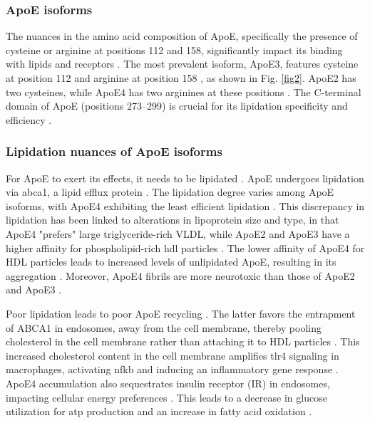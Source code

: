 \documentclass{amsart}
\begin{document}
\subsubsection{ApoE isoforms}
The nuances in the amino acid composition of ApoE, specifically the presence of cysteine or arginine at positions 112 and 158, significantly impact its binding with lipids and receptors \cite{Yassine2020APOEDisease}. The most prevalent isoform, ApoE3, features cysteine at position 112 and arginine at position 158  \cite{Yassine2020APOEDisease}, as shown in Fig. \ref{fig2}. ApoE2 has two cysteines, while ApoE4 has two arginines at these positions \cite{Yassine2020APOEDisease}. The C-terminal domain of ApoE (positions 273–299) is crucial for its lipidation specificity and efficiency \cite{Hu2015OpposingMice}.

\subsubsection{Lipidation nuances of ApoE isoforms}
For ApoE to exert its effects, it needs to be lipidated \cite{Husain2021APOETherapeutics}. ApoE undergoes lipidation via \acrfull{abca1}, a lipid efflux protein \cite{Flowers2020APOEBrain, Courtney2016LXRDisease}. The lipidation degree varies among ApoE isoforms, with ApoE4 exhibiting the least efficient lipidation \cite{Hu2015OpposingMice, Heinsinger2016ApolipoproteinFluid}. This discrepancy in lipidation has been linked to alterations in lipoprotein size and type, in that ApoE4 "prefers" large triglyceride-rich VLDL, while ApoE2 and ApoE3 have a higher affinity for phospholipid-rich \acrshort{hdl} particles \cite{Nguyen2010MolecularE4}. The lower affinity of ApoE4 for HDL particles leads to increased levels of unlipidated ApoE, resulting in its aggregation \cite{Hatters2006ApolipoproteinFunction}. Moreover, ApoE4 fibrils are more neurotoxic than those of ApoE2 and ApoE3 \cite{Hatters2006Amino-terminalFibrils}.

Poor lipidation leads to poor ApoE recycling \cite{Yassine2020APOEDisease}. The latter favors the entrapment of ABCA1 in endosomes, away from the cell membrane, thereby pooling cholesterol in the cell membrane rather than attaching it to HDL particles \cite{Rawat2019ApoE4Astrocytes}. This increased cholesterol content in the cell membrane amplifies \acrfull{tlr4} signaling in macrophages, activating \acrshort{nfkb} and inducing an inflammatory gene response \cite{Yassine2020APOEDisease}.  ApoE4 accumulation also sequestrates insulin receptor (IR) in endosomes, impacting cellular energy preferences \cite{Zhao2017ApolipoproteinEndosomes}. This leads to a decrease in glucose utilization for \acrshort{atp} production and an increase in fatty acid oxidation \cite{Svennerholm1997ChangesSwedes}. 
\end{document}
